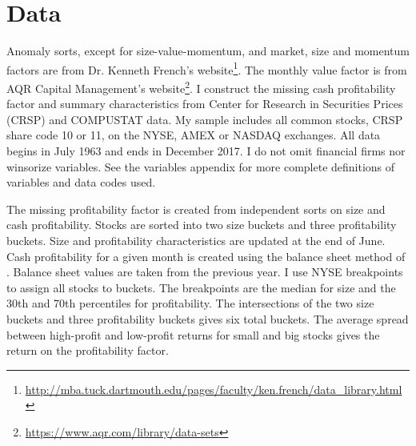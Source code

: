 
\section*{Data}

Anomaly sorts, except for size-value-momentum, and market, size and
momentum factors are from Dr. Kenneth French's website\footnote{
\url{http://mba.tuck.dartmouth.edu/pages/faculty/ken.french/data_library.html}
}. The monthly value factor is from AQR Capital Management's website\footnote{
\url{https://www.aqr.com/library/data-sets}
}.
I construct the missing cash profitability factor and summary characteristics
from Center for Research in Securities Prices (CRSP) and COMPUSTAT data. My
sample includes all common stocks, CRSP share code 10 or 11, on the NYSE, AMEX
or NASDAQ exchanges. All data begins in July 1963 and ends in December 2017. I
do not omit financial firms nor winsorize variables. See the variables appendix
for more complete definitions of variables and data codes used.

The missing profitability factor is created from independent sorts on size and
cash profitability.
Stocks are sorted into two size buckets and three profitability buckets.
Size and profitability characteristics are updated at the end of June.
Cash profitability for a given month is created using the balance sheet method
of \textcite{ball2016accruals}.
Balance sheet values are taken from the previous year. 
I use NYSE breakpoints to assign all stocks to buckets.
The breakpoints are the median for size and the 30th and 70th percentiles for
profitability.
The intersections of the two size buckets and three profitability buckets
gives six total buckets.
The average spread between high-profit and low-profit returns for small
and big stocks gives the return on the profitability factor.

